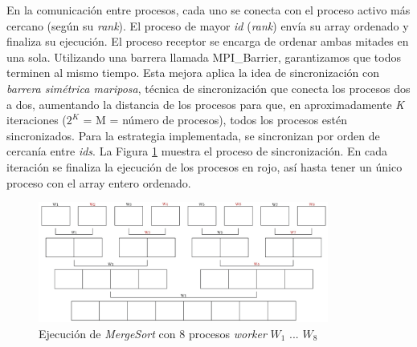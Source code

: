 	En la comunicación entre procesos, cada uno se conecta con el proceso activo más cercano (según su \textit{rank}). El proceso de mayor \textit{id} (\textit{rank}) envía su array ordenado y finaliza su ejecución. El proceso receptor se encarga de ordenar ambas mitades en una sola. Utilizando una barrera llamada MPI\_Barrier, garantizamos que todos terminen al mismo tiempo. Esta mejora aplica la idea de sincronización con \textit{barrera simétrica mariposa}, técnica de sincronización que conecta los procesos dos a dos, aumentando la distancia de los procesos para que, en aproximadamente \textit{K} iteraciones (\(2^{K}\) = M = número de procesos), todos los procesos estén sincronizados. Para la estrategia implementada, se sincronizan por orden de cercanía entre \textit{ids}. La Figura \ref{fig:mergesortmpi} muestra el proceso de sincronización. En cada iteración se finaliza la ejecución de los procesos en rojo, así hasta tener un único proceso con el array entero ordenado.  
	
	\vspace{0.2cm}
	
	\begin{figure}[!h]
		\centering
		\includegraphics[width=0.85\textwidth]{images/chapter_3/mergesort_mpi}
		\caption{Ejecución de \textit{MergeSort} con 8 procesos \textit{worker} \(W_{1}\) ... \(W_{8}\)}
		\label{fig:mergesortmpi}
	\end{figure}

